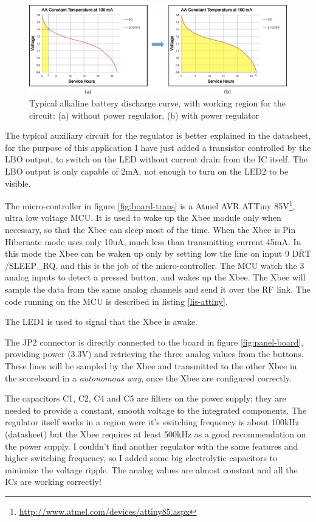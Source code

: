 \documentclass[11pt,english]{article}
\newcommand{\textoverline}[1]{$\overline{\mbox{#1}}$}
\begin{document}
%
\begin{figure}[htb]
\centering\includegraphics[scale=0.8]{img/Battery}

\caption{Typical alkaline battery discharge curve, with working region for the circuit: (a) without power regulator, (b) with 
power regulator\label{fig:board-battery}}

\end{figure}

The typical auxiliary circuit for the regulator is better explained in the datasheet, for the purpose of this application 
I have just added a transistor controlled by the LBO output, to switch on the LED without current drain from the IC itself.
The LBO output is only capable of 2mA, not enough to turn on the LED2 to be visible. 

The micro-controller in figure \ref{fig:board-trans} is a Atmel AVR ATTiny 85V\footnote{\url{http://www.atmel.com/devices/attiny85.aspx}}, 
ultra low voltage MCU. It is used to wake up the Xbee module only when necessary, so that the Xbee can sleep most of the time.
When the Xbee is Pin Hibernate mode uses only 10uA, much less than transmitting current 45mA. In this mode the Xbee can be 
waken up only by setting low the line on input 9 \textoverline{DRT}/SLEEP\_RQ, and this is the job of the micro-controller.
The MCU watch the 3 analog inputs to detect a pressed button, and wakes up the Xbee. The Xbee will sample the data from 
the same analog channels and send it over the RF link. The code running on the MCU is described in listing \ref{lis-attiny}.

The LED1 is used to signal that the Xbee is awake.

The JP2 connector is directly connected to the board in figure \ref{fig:panel-board}, providing power (3.3V) and retrieving 
the three analog values from the buttons. These lines will be sampled by the Xbee and transmitted to the other Xbee in the 
scoreboard in a \emph{autonomous way}, once the Xbee are configured correctly.

The capacitors C1, C2, C4 and C5 are filters on the power supply; they are needed to provide a constant, smooth voltage 
to the integrated components. The regulator itself works in a region were it's switching frequency is about 100kHz (datasheet)
but the Xbee requires at least 500kHz as a good recommendation on the power supply. I couldn't find another regulator with 
the same features and higher switching frequency, so I added some big electrolytic capacitors to minimize the voltage ripple.
The analog values are almost constant and all the ICs are working correctly! 
\end{document}
